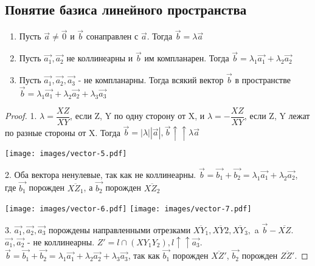 \subsection{Понятие базиса линейного пространства}
\begin{proposition}
\begin{enumerate}
	\item Пусть $\vec{a}\ne\vec{0}$ и $\vec{b}$ сонаправлен с $\vec{a}$.
	Тогда $\vec{b} = \lambda \vec{a}$
	\item Пусть $\vec{a_1}, \vec{a_2}$ не коллинеарны и $\vec{b}$ им компланарен. Тогда $\vec{b} = \lambda_1\vec{a_1} + \lambda_2\vec{a_2}$
	\item Пусть $\vec{a_1}, \vec{a_2}, \vec{a_3}$ - не компланарны. Тогда всякий вектор $\vec{b}$ в пространстве $\vec{b} = \lambda_1\vec{a_1} + \lambda_2\vec{a_2}+\lambda_3\vec{a_3}$
\end{enumerate}
\end{proposition}
\newpage
\begin{proof}
		1. $\lambda = \dfrac{XZ}{XY}$, если Z, Y по одну сторону от X, и $\lambda = - \dfrac{XZ}{XY}$, если Z, Y лежат по разные стороны от X. Тогда $\vec{b} = |\lambda||\vec{a}|, \vec{b}\uparrow\uparrow \lambda\vec{a}$
	
	\vspace{.7cm}
	\begin{center}
	\texttt{[image: images/vector-5.pdf]}
	\label{Vector5}
	\end{center}
	\vspace{.7cm}
		
	2. Оба вектора ненулевые, так как не коллинеарны.
	$\vec{b} = \vec{b_1}+\vec{b_2} = \lambda_1\vec{a_1} + \lambda_2\vec{a_2}$, где $\vec{b_1}$ порожден $\overline{XZ_1}$, а $\vec{b_2}$ порожден $\overline{XZ_2}$
		
		\vspace{.7cm}
		\hspace{.5cm}\texttt{[image: images/vector-6.pdf]} \hfil	\texttt{[image: images/vector-7.pdf]}
		\vspace{.7cm}
		
		3. $\vec{a_1}, \vec{a_2}, \vec{a_3}$ порождены направленными отрезками $\overline{XY_1}, \overline{XY2}, \overline{XY_3}, $ a $\vec{b} - \overline{XZ}$. $\vec{a_1}, \vec{a_2}$ - не коллинеарны. \(Z' = l\cap(XY_1Y_2), l \uparrow\uparrow \vec{a_3}\). $\vec{b} = \vec{b_1}+\vec{b_2} = \lambda_1 \vec{a_1} + \lambda_2\vec{a_2}+\lambda_3\vec{a_3}$, так как $\vec{b_1}$ порожден $\overline{XZ'}$, $\vec{b_2}$ порожден $\overline{ZZ'}$.
		
\end{proof}
